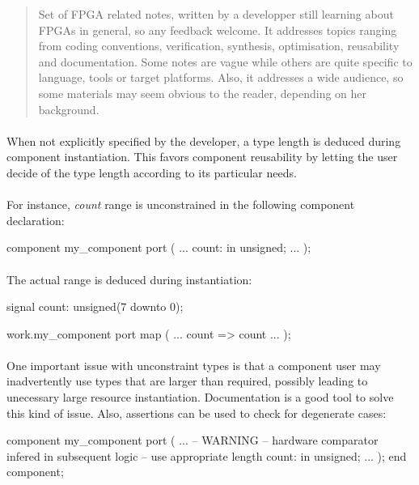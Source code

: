 \documentclass[12pt]{article}
\begin{document}
\begin{abstract}
Set of FPGA related notes, written by a developper still learning
about FPGAs in general, so any feedback welcome. It addresses topics
ranging from coding conventions, verification, synthesis, optimisation,
reusability and documentation. Some notes are vague while others are
quite specific to language, tools or target platforms. Also, it addresses
a wide audience, so some materials may seem obvious to the reader,
depending on her background.
\end{abstract}

\newpage
\setcounter{tocdepth}{1}
\tableofcontents



\paragraph{}
When not explicitly specified by the developer, a type length
is deduced during component instantiation. This favors component
reusability by letting the user decide of the type length
according to its particular needs.

\paragraph{}
For instance, \textit{count} range is unconstrained in the
following component declaration:
\begin{vhdl}
component my_component
port
(
 ...
 count: in unsigned;
 ...
);
\end{vhdl}

\paragraph{}
The actual range is deduced during instantiation:
\begin{vhdl}
signal count: unsigned(7 downto 0);

work.my_component
port map
(
 ...
 count => count
 ...
);
\end{vhdl}

\paragraph{}
One important issue with unconstraint types is that a component
user may inadvertently use types that are larger than required,
possibly leading to unecessary large resource instantiation.
Documentation is a good tool to solve this kind of issue. Also,
assertions can be used to check for degenerate cases:
\begin{vhdl}
component my_component
port
(
 ...
 -- WARNING
 -- hardware comparator infered in subsequent logic
 -- use appropriate length
 count: in unsigned;
 ...
);
end component;
\end{vhdl}
\end{document}
